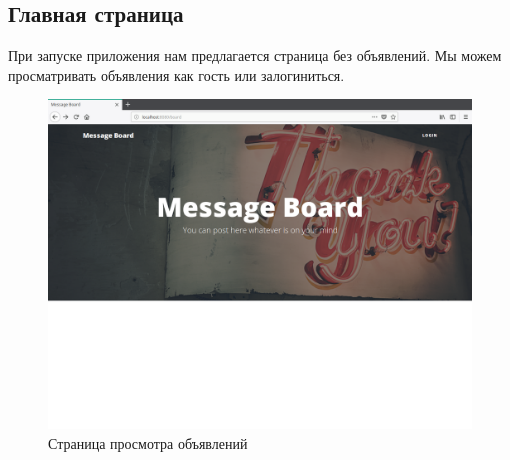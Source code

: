 \documentclass{article}
\begin{document}
    \subsection{Главная страница}
    При запуске приложения нам предлагается страница без объявлений.
    Мы можем просматривать объявления как гость или залогиниться. 
    \begin{figure}[H]
        \begin{flushleft}
            \centerline{\includegraphics[scale=0.3]{board_guest.png}}
            \caption{Страница просмотра объявлений}
        \end{flushleft}
    \end{figure}
	\pagebreak
\end{document}
